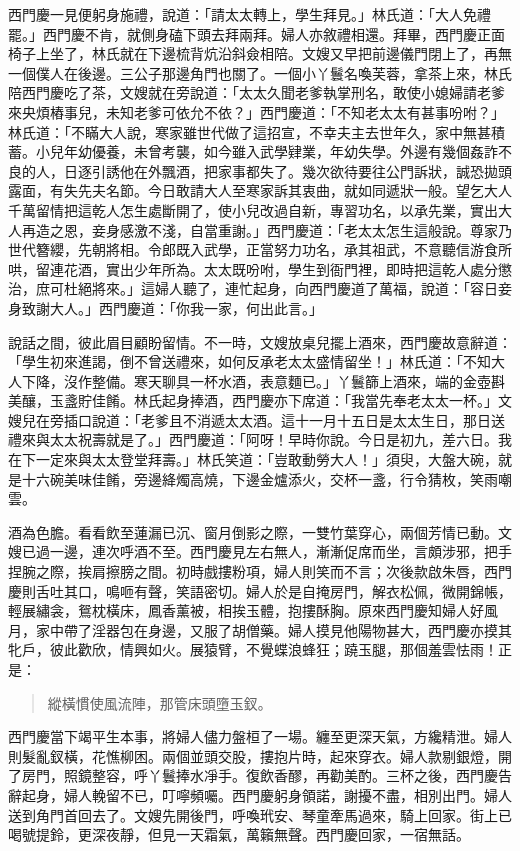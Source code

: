 西門慶一見便躬身施禮，說道：「請太太轉上，學生拜見。」林氏道：「大人免禮罷。」西門慶不肯，就側身磕下頭去拜兩拜。婦人亦敘禮相還。拜畢，西門慶正面椅子上坐了，林氏就在下邊梳背炕沿斜僉相陪。文嫂又早把前邊儀門閉上了，再無一個僕人在後邊。三公子那邊角門也關了。一個小丫鬟名喚芙蓉，拿茶上來，林氏陪西門慶吃了茶，文嫂就在旁說道：「太太久聞老爹執掌刑名，敢使小媳婦請老爹來央煩樁事兒，未知老爹可依允不依？」西門慶道：「不知老太太有甚事吩咐？」林氏道：「不瞞大人說，寒家雖世代做了這招宣，不幸夫主去世年久，家中無甚積蓄。小兒年幼優養，未曾考襲，如今雖入武學肄業，年幼失學。外邊有幾個姦詐不良的人，日逐引誘他在外飄酒，把家事都失了。幾次欲待要往公門訴狀，誠恐拋頭露面，有失先夫名節。今日敢請大人至寒家訴其衷曲，就如同遞狀一般。望乞大人千萬留情把這乾人怎生處斷開了，使小兒改過自新，專習功名，以承先業，實出大人再造之恩，妾身感激不淺，自當重謝。」西門慶道：「老太太怎生這般說。尊家乃世代簪纓，先朝將相。令郎既入武學，正當努力功名，承其祖武，不意聽信游食所哄，留連花酒，實出少年所為。太太既吩咐，學生到衙門裡，即時把這乾人處分懲治，庶可杜絕將來。」這婦人聽了，連忙起身，向西門慶道了萬福，說道：「容日妾身致謝大人。」西門慶道：「你我一家，何出此言。」

說話之間，彼此眉目顧盼留情。不一時，文嫂放桌兒擺上酒來，西門慶故意辭道：「學生初來進謁，倒不曾送禮來，如何反承老太太盛情留坐！」林氏道：「不知大人下降，沒作整備。寒天聊具一杯水酒，表意麵已。」丫鬟篩上酒來，端的金壺斟美釀，玉盞貯佳餚。林氏起身捧酒，西門慶亦下席道：「我當先奉老太太一杯。」文嫂兒在旁插口說道：「老爹且不消遞太太酒。這十一月十五日是太太生日，那日送禮來與太太祝壽就是了。」西門慶道：「阿呀！早時你說。今日是初九，差六日。我在下一定來與太太登堂拜壽。」林氏笑道：「豈敢動勞大人！」須臾，大盤大碗，就是十六碗美味佳餚，旁邊絳燭高燒，下邊金爐添火，交杯一盞，行令猜枚，笑雨嘲雲。

酒為色膽。看看飲至蓮漏已沉、窗月倒影之際，一雙竹葉穿心，兩個芳情已動。文嫂已過一邊，連次呼酒不至。西門慶見左右無人，漸漸促席而坐，言頗涉邪，把手捏腕之際，挨肩擦膀之間。初時戲摟粉項，婦人則笑而不言；次後款啟朱唇，西門慶則舌吐其口，鳴咂有聲，笑語密切。婦人於是自掩房門，解衣松佩，微開錦帳，輕展繡衾，鴛枕橫床，鳳香薰被，相挨玉體，抱摟酥胸。原來西門慶知婦人好風月，家中帶了淫器包在身邊，又服了胡僧藥。婦人摸見他陽物甚大，西門慶亦摸其牝戶，彼此歡欣，情興如火。展猿臂，不覺蝶浪蜂狂；蹺玉腿，那個羞雲怯雨！正是：
\begin{quote}
縱橫慣使風流陣，那管床頭墮玉釵。
\end{quote}

西門慶當下竭平生本事，將婦人儘力盤桓了一場。纏至更深天氣，方纔精泄。婦人則髮亂釵橫，花憔柳困。兩個並頭交股，摟抱片時，起來穿衣。婦人款剔銀燈，開了房門，照鏡整容，呼丫鬟捧水凈手。復飲香醪，再勸美酌。三杯之後，西門慶告辭起身，婦人輓留不已，叮嚀頻囑。西門慶躬身領諾，謝擾不盡，相別出門。婦人送到角門首回去了。文嫂先開後門，呼喚玳安、琴童牽馬過來，騎上回家。街上已喝號提鈴，更深夜靜，但見一天霜氣，萬籟無聲。西門慶回家，一宿無話。

